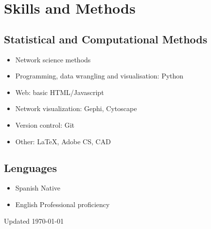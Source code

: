 \documentclass{academiccv}
\begin{document}






\section*{Skills and Methods}

\subsection*{Statistical and Computational Methods}

\begin{itemize}
	
\item Network science methods
\item Programming, data wrangling and visualisation: Python
\item Web: basic HTML/Javascript
\item Network visualization: Gephi, Cytoscape
\item Version control: Git
\item Other: \LaTeX, Adobe CS, CAD

\end{itemize}


\subsection*{Lenguages}

\begin{itemize}
	
\item Spanish \tab Native
\item English \tab Professional proficiency 

\end{itemize}



\begin{center}
\vspace{6em}
Updated \monthyeardate\today
\end{center}
\end{document}
